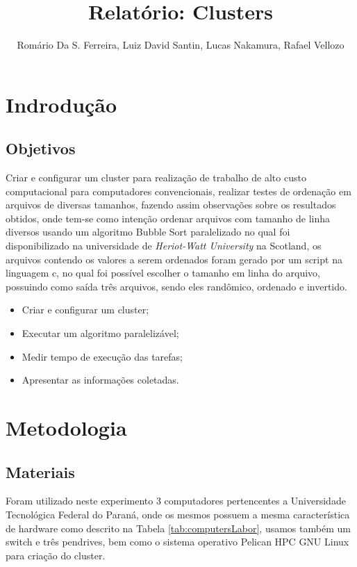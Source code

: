 \documentclass[12pt]{article}
\title{\textbf{Relatório}: Clusters}
\author{
    Romário Da S. Ferreira\inst{1},
    Luiz David Santin\inst{2},
    Lucas Nakamura\inst{3},
    Rafael Vellozo \inst{4}
}
\begin{document}
 

\maketitle

\section{Indrodução}
\subsection{Objetivos}

Criar e configurar um cluster para realização de trabalho de alto custo computacional para computadores convencionais, realizar testes de ordenação em arquivos de diversas tamanhos, fazendo assim observações sobre os resultados obtidos, onde tem-se como intenção ordenar arquivos com tamanho de linha diversos usando um algoritmo Bubble Sort paralelizado no qual foi disponibilizado na universidade de \textit{Heriot-Watt University} na Scotland, os arquivos contendo os valores a serem ordenados foram gerado por um script na linguagem c, no qual foi possível escolher o tamanho em linha do arquivo, possuindo como saída três arquivos, sendo eles randômico, ordenado e invertido.

\begin{itemize}
    \item Criar e configurar um cluster;
    \item Executar um algoritmo paralelizável;
    \item Medir tempo de execução das tarefas;
    \item Apresentar as informações coletadas.
\end{itemize}

\section{Metodologia} \label{sec:firstpage}
\subsection{Materiais}

Foram utilizado neste experimento 3 computadores pertencentes a Universidade Tecnológica Federal do Paraná, onde os mesmos
possuem a mesma característica de hardware como descrito na Tabela \ref{tab:computersLabor}, usamos também um switch e três pendrives, bem como o sistema operativo Pelican HPC GNU Linux para criação do cluster.
\end{document}
